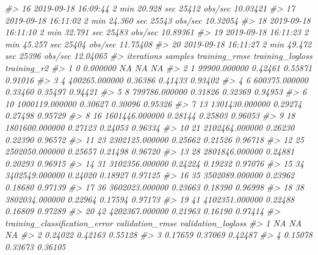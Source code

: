 \documentclass[]{book}
\newenvironment{Shaded}{\begin{snugshade}}{\end{snugshade}}
\newcommand{\CommentTok}[1]{\textcolor[rgb]{0.56,0.35,0.01}{\textit{#1}}}
\begin{document}
\begin{Shaded}
\begin{Highlighting}[]
{{{{\CommentTok{#> 16 2019-09-18 16:09:44  2 min 20.928 sec  25412 obs/sec 10.03421}
\CommentTok{#> 17 2019-09-18 16:11:02  2 min 24.360 sec  25543 obs/sec 10.32054}
\CommentTok{#> 18 2019-09-18 16:11:10  2 min 32.791 sec  25483 obs/sec 10.89361}
\CommentTok{#> 19 2019-09-18 16:11:23  2 min 45.257 sec  25404 obs/sec 11.75408}
\CommentTok{#> 20 2019-09-18 16:11:27  2 min 49.472 sec  25396 obs/sec 12.04065}
\CommentTok{#>    iterations        samples training_rmse training_logloss training_r2}
\CommentTok{#> 1           0       0.000000            NA               NA          NA}
\CommentTok{#> 2           1   99900.000000       0.42461          0.55871     0.91016}
\CommentTok{#> 3           4  400265.000000       0.36386          0.41433     0.93402}
\CommentTok{#> 4           6  600375.000000       0.33460          0.35497     0.94421}
\CommentTok{#> 5           8  799786.000000       0.31826          0.32369     0.94953}
\CommentTok{#> 6          10 1000119.000000       0.30627          0.30096     0.95326}
\CommentTok{#> 7          13 1301430.000000       0.29274          0.27498     0.95729}
\CommentTok{#> 8          16 1601446.000000       0.28144          0.25803     0.96053}
\CommentTok{#> 9          18 1801600.000000       0.27123          0.24053     0.96334}
\CommentTok{#> 10         21 2102464.000000       0.26230          0.22390     0.96572}
\CommentTok{#> 11         23 2302125.000000       0.25662          0.21526     0.96718}
\CommentTok{#> 12         25 2502050.000000       0.25657          0.21498     0.96720}
\CommentTok{#> 13         28 2801846.000000       0.24881          0.20293     0.96915}
\CommentTok{#> 14         31 3102356.000000       0.24224          0.19232     0.97076}
\CommentTok{#> 15         34 3402549.000000       0.24020          0.18927     0.97125}
\CommentTok{#> 16         35 3502089.000000       0.23962          0.18680     0.97139}
\CommentTok{#> 17         36 3602023.000000       0.23663          0.18390     0.96998}
\CommentTok{#> 18         38 3802034.000000       0.22964          0.17594     0.97173}
\CommentTok{#> 19         41 4102351.000000       0.22488          0.16809     0.97289}
\CommentTok{#> 20         42 4202367.000000       0.21963          0.16190     0.97414}
\CommentTok{#>    training_classification_error validation_rmse validation_logloss}
\CommentTok{#> 1                             NA              NA                 NA}
\CommentTok{#> 2                        0.24022         0.42163            0.55128}
\CommentTok{#> 3                        0.17659         0.37069            0.42487}
\CommentTok{#> 4                        0.15078         0.33673            0.36105}
}}}}
\end{Highlighting}
\end{Shaded}
\end{document}
